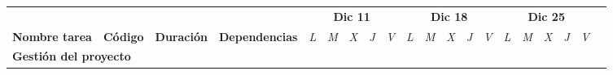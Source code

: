 \begin{longtable}[c]{llclllllllllllllllll}
        \multicolumn{1}{|c|}{}                                                                & \multicolumn{1}{c|}{}                                                          & \multicolumn{1}{c|}{}                                                            & \multicolumn{1}{c|}{}                                                                & \multicolumn{5}{c|}{\textbf{Dic 11}}                                                                                                                                    & \multicolumn{5}{c|}{\textbf{Dic 18}}                                                                                                                                    & \multicolumn{5}{c|}{\textbf{Dic 25}}                                                                                                                                                  &  \\ \cline{5-19}
        \multicolumn{1}{|c|}{\multirow{-2}{*}{\textbf{Nombre tarea}}}                         & \multicolumn{1}{c|}{\multirow{-2}{*}{\textbf{Código}}}                         & \multicolumn{1}{c|}{\multirow{-2}{*}{\textbf{Duración}}}                         & \multicolumn{1}{c|}{\multirow{-2}{*}{\textbf{Dependencias}}}                         & \multicolumn{1}{l|}{\textit{L}} & \multicolumn{1}{l|}{\textit{M}} & \multicolumn{1}{l|}{\textit{X}} & \multicolumn{1}{l|}{\textit{J}} & \multicolumn{1}{l|}{\textit{V}} & \multicolumn{1}{l|}{\textit{L}} & \multicolumn{1}{l|}{\textit{M}} & \multicolumn{1}{l|}{\textit{X}} & \multicolumn{1}{l|}{\textit{J}} & \multicolumn{1}{l|}{\textit{V}} & \multicolumn{1}{l|}{\textit{L}} & \multicolumn{1}{l|}{\textit{M}} & \multicolumn{1}{l|}{\textit{X}} & \multicolumn{1}{l|}{\textit{J}} & \multicolumn{1}{l|}{\textit{V}}               &  \\ \cline{1-19}
        \multicolumn{4}{|l|}{\textbf{Gestión del proyecto}}                                                                                                                                                                                                                                                                                              & \multicolumn{15}{l|}{}                                                                                                                                                                                                                                                                                                                                                                                                                                                                                                                    &  \\ \cline{1-19}

\end{longtable}
